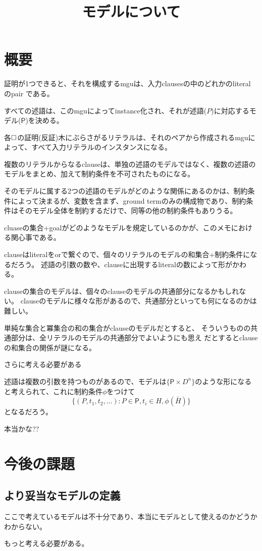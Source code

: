 \documentclass[10pt, onecolumn]{jarticle}   	%
\title{モデルについて}
\author{\myname}
\date{}					%
\begin{document}
\maketitle

\section{概要}
証明が1つできると、それを構成するmguは、入力clausesの中のどれかのliteral のpair である。

すべての述語は、このmguによってinstance化され、それが述語($P$)に対応するモデル($\mathsf{P}$)を決める。

各$\square$の証明(反証)木にぶらさがるリテラルは、それのペアから作成されるmguによって、すべて入力リテラルのインスタンスになる。

複数のリテラルからなるclauseは、単独の述語のモデルではなく、複数の述語のモデルをまとめ、加えて制約条件を不可されたものになる。

そのモデルに属する2つの述語のモデルがどのような関係にあるのかは、制約条件によって決まるが、変数を含まず、ground termのみの構成物であり、制約条件はそのモデル全体を制約するだけで、同等の他の制約条件もありうる。

cluaseの集合+goalがどのようなモデルを規定しているのかが、このメモにおける関心事である。

clauseはliteralをorで繋ぐので、個々のリテラルのモデルの和集合+制約条件になるだろう。
述語の引数の数や、clauseに出現するliteralの数によって形がかわる。

clauseの集合のモデルは、個々のclauseのモデルの共通部分になるかもしれない。
clauseのモデルに様々な形があるので、共通部分といっても何になるのかは難しい。

単純な集合と冪集合の和の集合がclauseのモデルだとすると、
そういうものの共通部分は、全リテラルのモデルの共通部分でよいようにも思え
だとするとclauseの和集合の関係が謎になる。

さらに考える必要がある


述語は複数の引数を持つものがあるので、モデルは$\{\mathsf{P} \times D^n\}$のような形になると考えられて、これに制約条件$\phi$をつけて
$$\{(P, t_1,t_2,\dots) : P \in \mathsf{P}, t_i \in H, \phi(\bar{H})\}$$
となるだろう。

本当かな??


%

\section{今後の課題}
\subsection{より妥当なモデルの定義}
ここで考えているモデルは不十分であり、本当にモデルとして使えるのかどうかわからない。

もっと考える必要がある。
\end{document}
